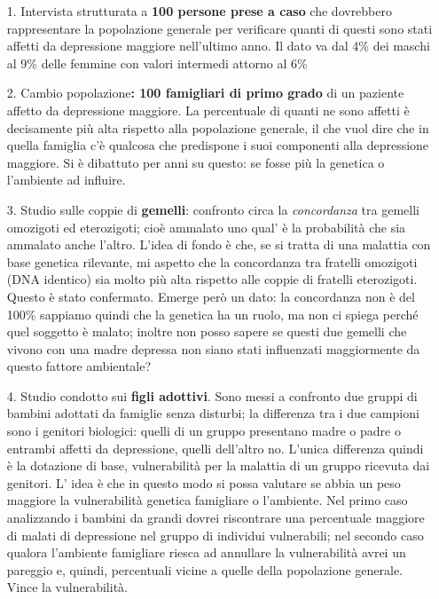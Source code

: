 \begin{itemize}
\item[1.]
  Intervista strutturata a \textbf{100 persone prese a caso} che
  dovrebbero rappresentare la popolazione generale per verificare quanti
  di questi sono stati affetti da depressione maggiore nell'ultimo anno.
  Il dato va dal 4\% dei maschi al 9\% delle femmine con valori
  intermedi attorno al 6\%
\item[2.]
  Cambio popolazione\textbf{: 100 famigliari di primo grado} di un
  paziente affetto da depressione maggiore. La percentuale di quanti ne
  sono affetti è decisamente più alta rispetto alla popolazione
  generale, il che vuol dire che in quella famiglia c'è qualcosa che
  predispone i suoi componenti alla depressione maggiore. Si è dibattuto
  per anni su questo: se fosse più la genetica o l'ambiente ad influire.
\item[3.]
  Studio sulle coppie di \textbf{gemelli}: confronto circa la
  \emph{concordanza} tra gemelli omozigoti ed eterozigoti; cioè ammalato
  uno qual' è la probabilità che sia ammalato anche l'altro. L'idea di
  fondo è che, se si tratta di una malattia con base genetica rilevante,
  mi aspetto che la concordanza tra fratelli omozigoti (DNA identico)
  sia molto più alta rispetto alle coppie di fratelli eterozigoti.
  Questo è stato confermato. Emerge però un dato: la concordanza non è
  del 100\% sappiamo quindi che la genetica ha un ruolo, ma non ci
  spiega perché quel soggetto è malato; inoltre non posso sapere se
  questi due gemelli che vivono con una madre depressa non siano stati
  influenzati maggiormente da questo fattore ambientale?
\item[4.]
  Studio condotto sui \textbf{figli adottivi}. Sono messi a confronto
  due gruppi di bambini adottati da famiglie senza disturbi; la
  differenza tra i due campioni sono i genitori biologici: quelli di un
  gruppo presentano madre o padre o entrambi affetti da depressione,
  quelli dell'altro no. L'unica differenza quindi è la dotazione di
  base, vulnerabilità per la malattia di un gruppo ricevuta dai
  genitori. L' idea è che in questo modo si possa valutare se abbia un
  peso maggiore la vulnerabilità genetica famigliare o l'ambiente. Nel
  primo caso analizzando i bambini da grandi dovrei riscontrare una
  percentuale maggiore di malati di depressione nel gruppo di individui
  vulnerabili; nel secondo caso qualora l'ambiente famigliare riesca ad
  annullare la vulnerabilità avrei un pareggio e, quindi, percentuali
  vicine a quelle della popolazione generale. Vince la vulnerabilità.
\end{itemize}

